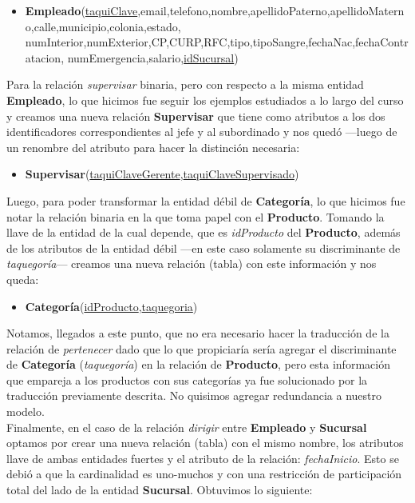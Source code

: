 \documentclass[11pt,letterpaper]{article}
\begin{document}
\begin{itemize}
\item \footnotesize{\textbf{Empleado}(\underline{taquiClave},email,telefono,nombre,apellidoPaterno,apellidoMaterno,calle,municipio,colonia,estado,
numInterior,numExterior,CP,CURP,RFC,tipo,tipoSangre,fechaNac,fechaContratacion,
numEmergencia,salario,\underline{idSucursal})}
\end{itemize}

Para la relación \textit{supervisar} binaria, pero con respecto a la misma entidad \textbf{Empleado}, lo que hicimos fue seguir los ejemplos estudiados a lo largo del curso y creamos una nueva relación \textbf{Supervisar} que tiene como atributos a los dos identificadores correspondientes al jefe y al subordinado y nos quedó ---luego de un renombre del atributo para hacer la distinción necesaria:

\begin{itemize}
\item \footnotesize{\textbf{Supervisar}(\underline{taquiClaveGerente},\underline{taquiClaveSupervisado})}
\end{itemize}

Luego, para poder transformar la entidad débil de \textbf{Categoría}, lo que hicimos fue notar la relación binaria en la que toma papel con el \textbf{Producto}. Tomando la llave de la entidad de la cual depende, que es \textit{idProducto} del \textbf{Producto}, además de los atributos de la entidad débil ---en este caso solamente su discriminante de \textit{taquegoría}--- creamos una nueva relación (tabla) con este información y nos queda:

\begin{itemize}
\item \footnotesize{\textbf{Categoría}(\underline{idProducto},\underline{taquegoria})}
\end{itemize}

Notamos, llegados a este punto, que no era necesario hacer la traducción de la relación de \textit{pertenecer} dado que lo que propiciaría sería agregar el discriminante de \textbf{Categoría} (\textit{taquegoría}) en la relación de \textbf{Producto}, pero esta información que empareja a los productos con sus categorías ya fue solucionado por la traducción previamente descrita. No quisimos agregar redundancia a nuestro modelo.\\

Finalmente, en el caso de la relación \textit{dirigir} entre \textbf{Empleado} y \textbf{Sucursal} optamos por crear una nueva relación (tabla) con el mismo nombre, los atributos llave de ambas entidades fuertes y el atributo de la relación: \textit{fechaInicio}. Esto se debió a que la cardinalidad es uno-muchos y con una restricción de participación total del lado de la entidad \textbf{Sucursal}. Obtuvimos lo siguiente:
\end{document}
